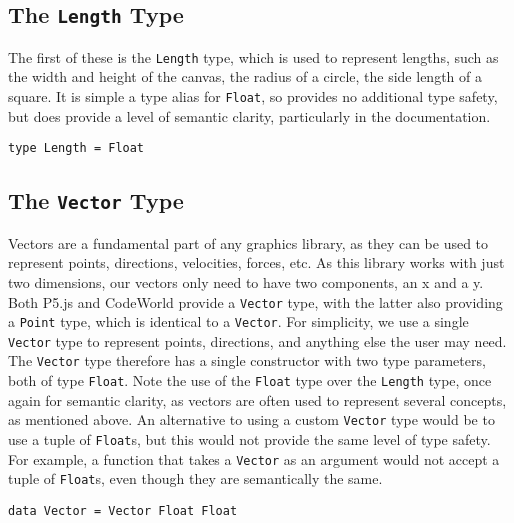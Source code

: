 \documentclass[../main.tex]{subfiles}
\begin{document}
        \subsection{The \texttt{Length}
            Type} The first of these is the \texttt{Length} type, which is used to
                represent lengths, such as the width and height of the canvas, the radius of a
                circle, the side length of a square.
            It is simple a type alias for \texttt{Float}, so provides no additional type
                safety, but does provide a level of semantic clarity, particularly in the
                documentation.
            \begin{lstlisting}[label={lst:length}, caption={The \texttt{Length} type definition.}]
type Length = Float\end{lstlisting}

        \subsection{The \texttt{Vector}
            Type} Vectors are a fundamental part of any graphics library, as they can be
                used to represent points, directions, velocities, forces, etc. As this library
                works with just two dimensions, our vectors only need to have two components,
                an x and a y.
            Both P5.js and CodeWorld provide a \texttt{Vector} type, with the latter also
                providing a \texttt{Point} type, which is identical to a \texttt{Vector}.
            For simplicity, we use a single \texttt{Vector} type to represent points,
                directions, and anything else the user may need.
            The \texttt{Vector} type therefore has a single constructor with two type
                parameters, both of type \texttt{Float}.
            Note the use of the \texttt{Float} type over the \texttt{Length} type, once
                again for semantic clarity, as vectors are often used to represent several
                concepts, as mentioned above.
            An alternative to using a custom \texttt{Vector} type would be to use a tuple
                of \texttt{Float}s, but this would not provide the same level of type safety.
            For example, a function that takes a \texttt{Vector} as an argument would not
                accept a tuple of \texttt{Float}s, even though they are semantically the same.

            \begin{lstlisting}[label={lst:vector}, caption={The \texttt{Vector} type definition.}]
data Vector = Vector Float Float\end{lstlisting}
\end{document}
